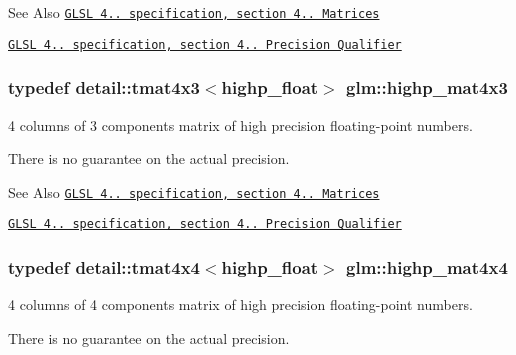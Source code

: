 \begin{DoxySeeAlso}{See Also}
\href{http://www.opengl.org/registry/doc/GLSLangSpec.4.20.8.pdf}{\tt G\-L\-S\-L 4.. specification, section 4.. Matrices} 

\href{http://www.opengl.org/registry/doc/GLSLangSpec.4.20.8.pdf}{\tt G\-L\-S\-L 4.. specification, section 4.. Precision Qualifier} 
\end{DoxySeeAlso}
\hypertarget{group__core__precision_ga940a4f42a51d8dee13869ca90aa24df6}{
\subsubsection[{highp\-\_\-mat4x3}]{\setlength{\rightskip}{0pt plus 5cm}typedef detail\-::tmat4x3$<$highp\-\_\-float$>$ {\bf glm\-::highp\-\_\-mat4x3}}}\label{group__core__precision_ga940a4f42a51d8dee13869ca90aa24df6}


4 columns of 3 components matrix of high precision floating-\/point numbers. 

There is no guarantee on the actual precision.

\begin{DoxySeeAlso}{See Also}
\href{http://www.opengl.org/registry/doc/GLSLangSpec.4.20.8.pdf}{\tt G\-L\-S\-L 4.. specification, section 4.. Matrices} 

\href{http://www.opengl.org/registry/doc/GLSLangSpec.4.20.8.pdf}{\tt G\-L\-S\-L 4.. specification, section 4.. Precision Qualifier} 
\end{DoxySeeAlso}
\hypertarget{group__core__precision_gaa277c02de6192621d520335f0d2e4930}{
\subsubsection[{highp\-\_\-mat4x4}]{\setlength{\rightskip}{0pt plus 5cm}typedef detail\-::tmat4x4$<$highp\-\_\-float$>$ {\bf glm\-::highp\-\_\-mat4x4}}}\label{group__core__precision_gaa277c02de6192621d520335f0d2e4930}


4 columns of 4 components matrix of high precision floating-\/point numbers. 

There is no guarantee on the actual precision.

